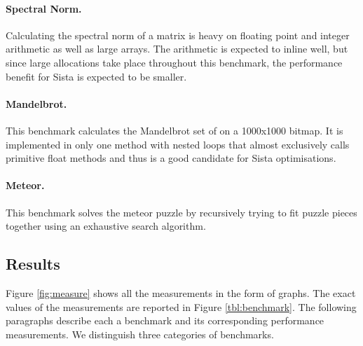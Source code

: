 \documentclass[a4paper,12pt,twoside]{../includes/ThesisStyle}
\begin{document}
	\paragraph{Spectral Norm.}Calculating the spectral norm of a matrix is heavy on floating point and integer arithmetic as well as large arrays. The arithmetic is expected to inline well, but since large allocations take place throughout this benchmark, the performance benefit for Sista is expected to be smaller.

	\paragraph{Mandelbrot.}This benchmark calculates the Mandelbrot set of on a 1000x1000 bitmap. It is implemented in only one method with nested loops that almost exclusively calls primitive float methods and thus is a good candidate for Sista optimisations.

	\paragraph{Meteor.}This benchmark solves the meteor puzzle by recursively trying to fit puzzle pieces together using an exhaustive search algorithm.

\subsection{Results}

Figure \ref{fig:measure} shows all the measurements in the form of graphs. The exact values of the measurements are reported in Figure \ref{tbl:benchmark}. The following paragraphs describe each a benchmark and its corresponding performance measurements. We distinguish three categories of benchmarks.
\end{document}
